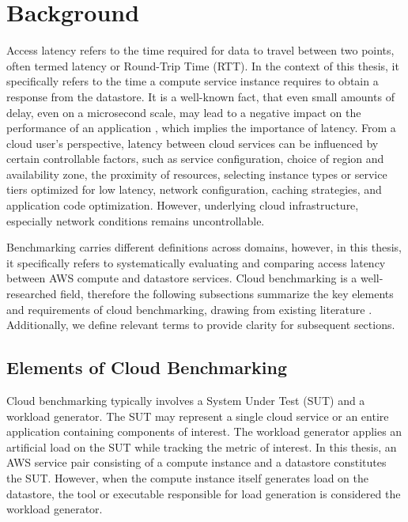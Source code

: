 \section{Background}
\label{cha:background}

Access latency refers to the time required for data to travel between two points, often termed latency or Round-Trip Time (RTT). In the context of this thesis, it specifically refers to the time a compute service instance requires to obtain a response from the datastore. It is a well-known fact, that even small amounts of delay, even on a microsecond scale, may lead to a negative impact on the performance of an application \cite{atricle_dean_tail,book_popescu_netlat}, which implies the importance of latency.
%
From a cloud user's perspective, latency between cloud services can be influenced by certain controllable factors, such as service configuration, choice of region and availability zone, the proximity of resources, selecting instance types or service tiers optimized for low latency, network configuration, caching strategies, and application code optimization. However, underlying cloud infrastructure, especially network conditions remains uncontrollable.

Benchmarking carries different definitions across domains, however, in this thesis, it specifically refers to systematically evaluating and comparing access latency between AWS compute and datastore services. Cloud benchmarking is a well-researched field, therefore the following subsections summarize the key elements and requirements of cloud benchmarking, drawing from existing literature \cite{paper_binnig_weather,paper_cooper_ycsb,paper_folkerts_benchmarking,book_bermbach_cloud_service_benchmarking}. Additionally, we define relevant terms to provide clarity for subsequent sections.

\subsection{Elements of Cloud Benchmarking}
\label{elems_of_bench}

Cloud benchmarking typically involves a System Under Test (SUT) and a workload generator. The SUT may represent a single cloud service or an entire application containing components of interest. The workload generator applies an artificial load on the SUT while tracking the metric of interest. In this thesis, an AWS service pair consisting of a compute instance and a datastore constitutes the SUT. However, when the compute instance itself generates load on the datastore, the tool or executable responsible for load generation is considered the workload generator.

